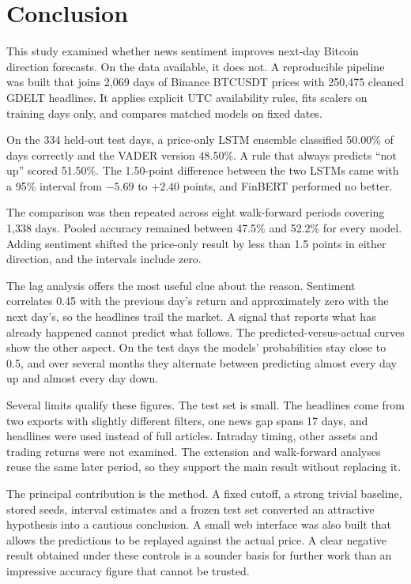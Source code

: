\section{Conclusion}
\label{ch:conclusion}
This study examined whether news sentiment improves next-day Bitcoin direction forecasts. On the data available, it does not. A reproducible pipeline was built that joins 2,069 days of Binance BTCUSDT prices with 250,475 cleaned GDELT headlines. It applies explicit UTC availability rules, fits scalers on training days only, and compares matched models on fixed dates.

On the 334 held-out test days, a price-only LSTM ensemble classified 50.00\% of days correctly and the VADER version 48.50\%. A rule that always predicts ``not up'' scored 51.50\%. The 1.50-point difference between the two LSTMs came with a 95\% interval from $-5.69$ to $+2.40$ points, and FinBERT performed no better.

The comparison was then repeated across eight walk-forward periods covering 1,338 days. Pooled accuracy remained between 47.5\% and 52.2\% for every model. Adding sentiment shifted the price-only result by less than 1.5 points in either direction, and the intervals include zero.

The lag analysis offers the most useful clue about the reason. Sentiment correlates 0.45 with the previous day's return and approximately zero with the next day's, so the headlines trail the market. A signal that reports what has already happened cannot predict what follows. The predicted-versus-actual curves show the other aspect. On the test days the models' probabilities stay close to 0.5, and over several months they alternate between predicting almost every day up and almost every day down.

Several limits qualify these figures. The test set is small. The headlines come from two exports with slightly different filters, one news gap spans 17 days, and headlines were used instead of full articles. Intraday timing, other assets and trading returns were not examined. The extension and walk-forward analyses reuse the same later period, so they support the main result without replacing it.

The principal contribution is the method. A fixed cutoff, a strong trivial baseline, stored seeds, interval estimates and a frozen test set converted an attractive hypothesis into a cautious conclusion. A small web interface was also built that allows the predictions to be replayed against the actual price. A clear negative result obtained under these controls is a sounder basis for further work than an impressive accuracy figure that cannot be trusted.

